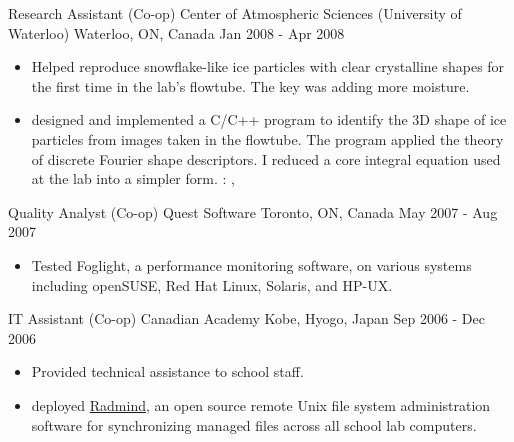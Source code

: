 \cventry
  {Research Assistant (Co-op)} %
  {Center of Atmospheric Sciences (University of Waterloo)} %
  {Waterloo, ON, Canada} %
  {Jan 2008 - Apr 2008} %
  {
    \begin{itemize} %
      \liststyle
      \item {Helped reproduce snowflake-like ice particles with clear crystalline shapes for the first time in the lab's flowtube. The key was adding more moisture.}
      \item { designed and implemented a C/C++ program to identify the 3D shape of ice particles from images taken in the flowtube. 
      The program applied the theory of discrete Fourier shape descriptors.
      I reduced a core integral equation used at the lab into a simpler form.
      \tgskills: \rfcpp, \rfmysql}
    \end{itemize}
  }

\cventry
  {Quality Analyst (Co-op)} %
  {Quest Software} %
  {Toronto, ON, Canada} %
  {May 2007 - Aug 2007} %
  {
    \begin{itemize} %
      \liststyle
      \item {Tested Foglight, a performance monitoring software, on various systems including openSUSE, Red Hat Linux, Solaris, and HP-UX.}
    \end{itemize}
  }

\cventry
  {IT Assistant (Co-op)} %
  {Canadian Academy} %
  {Kobe, Hyogo, Japan} %
  {Sep 2006 - Dec 2006} %
  {
    \begin{itemize} %
      \liststyle
      \item {Provided technical assistance to school staff.}
      \item { deployed \href{http://www.radmind.org/}{Radmind}, an open source remote Unix file system administration software for synchronizing managed files across all school lab computers.}
    \end{itemize}
  }
